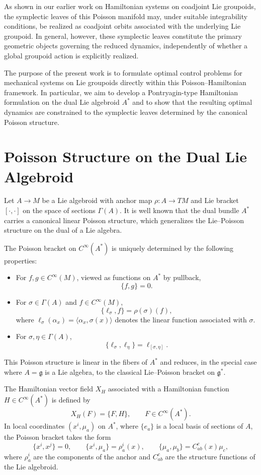 \documentclass{article}
\begin{document}
As shown in our earlier work on Hamiltonian systems on coadjoint Lie groupoids, the symplectic leaves of this Poisson manifold may, under suitable integrability conditions, be realized as coadjoint orbits associated with the underlying Lie groupoid.  
In general, however, these symplectic leaves constitute the primary geometric objects governing the reduced dynamics, independently of whether a global groupoid action is explicitly realized.

The purpose of the present work is to formulate optimal control problems for mechanical systems on Lie groupoids directly within this Poisson--Hamiltonian framework.  
In particular, we aim to develop a Pontryagin-type Hamiltonian formulation on the dual Lie algebroid $A^*$ and to show that the resulting optimal dynamics are constrained to the symplectic leaves determined by the canonical Poisson structure.

\section{Poisson Structure on the Dual Lie Algebroid}

Let $A \to M$ be a Lie algebroid with anchor map $\rho : A \to TM$ and Lie bracket $[\cdot,\cdot]$ on the space of sections $\Gamma(A)$.  
It is well known that the dual bundle $A^*$ carries a canonical linear Poisson structure, which generalizes the Lie--Poisson structure on the dual of a Lie algebra.

The Poisson bracket on $C^\infty(A^*)$ is uniquely determined by the following properties:
\begin{itemize}
\item For $f,g \in C^\infty(M)$, viewed as functions on $A^*$ by pullback,
\[
\{f,g\} = 0.
\]
\item For $\sigma \in \Gamma(A)$ and $f \in C^\infty(M)$,
\[
\{\ell_\sigma,f\} = \rho(\sigma)(f),
\]
where $\ell_\sigma(\alpha_x) = \langle \alpha_x,\sigma(x)\rangle$ denotes the linear function associated with $\sigma$.
\item For $\sigma,\eta \in \Gamma(A)$,
\[
\{\ell_\sigma,\ell_\eta\} = \ell_{[\sigma,\eta]}.
\]
\end{itemize}

This Poisson structure is linear in the fibers of $A^*$ and reduces, in the special case where $A=\mathfrak g$ is a Lie algebra, to the classical Lie--Poisson bracket on $\mathfrak g^*$.

The Hamiltonian vector field $X_H$ associated with a Hamiltonian function $H \in C^\infty(A^*)$ is defined by
\[
X_H(F) = \{F,H\}, \qquad F \in C^\infty(A^*).
\]
In local coordinates $(x^i,\mu_a)$ on $A^*$, where $\{e_a\}$ is a local basis of sections of $A$, the Poisson bracket takes the form
\[
\{x^i,x^j\} = 0, \qquad
\{x^i,\mu_a\} = \rho_a^i(x), \qquad
\{\mu_a,\mu_b\} = C_{ab}^c(x)\mu_c,
\]
where $\rho_a^i$ are the components of the anchor and $C_{ab}^c$ are the structure functions of the Lie algebroid.
\end{document}
